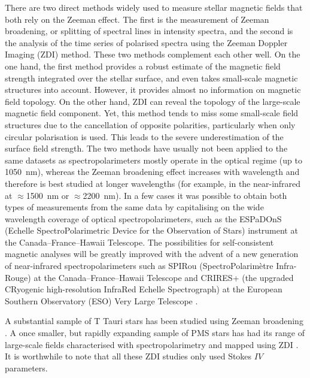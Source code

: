\documentclass{aa}
\begin{document}
There are two direct methods widely used to measure stellar magnetic fields that both rely on the Zeeman effect. The first is the measurement of Zeeman broadening, or splitting of spectral lines in intensity spectra, and the second is the analysis of the time series of polarised spectra using the Zeeman Doppler Imaging (ZDI) method. These two methods complement each other well. On the one hand, the first method provides a robust estimate of the magnetic field strength integrated over the stellar surface, and even takes small-scale magnetic structures into account. However, it provides almost no information on magnetic field topology. On the other hand, ZDI can reveal the topology of the large-scale magnetic field component. Yet, this method tends to miss some small-scale field structures due to the cancellation of opposite polarities, particularly when only circular polarisation is used. This leads to the severe underestimation of the surface field strength. The two methods have usually not been applied to the same datasets as spectropolarimeters mostly operate in the optical regime (up to 1050~nm), whereas the Zeeman broadening effect increases with wavelength and therefore is best studied at longer wavelengths (for example, in the near-infrared at $\approx$1500~nm or $\approx$2200~nm). In a few cases it was possible to obtain both types of measurements from the same data \citep{2017ApJ...835L...4K,2019MNRAS.tmp..410H,2019ApJ...873...69K} by capitalising on the wide wavelength coverage of optical spectropolarimeters, such as the ESPaDOnS (Echelle SpectroPolarimetric Device for the Observation of Stars) instrument \citep{donati2003-espadons} at the Canada--France--Hawaii Telescope. The possibilities for self-consistent magnetic analyses will be greatly improved with the advent of a new generation of near-infrared spectropolarimeters such as SPIRou (SpectroPolarim\`etre Infra-Rouge) at the Canada--France--Hawaii Telescope and CRIRES+ (the upgraded CRyogenic high-resolution InfraRed Echelle Spectrograph) at the European Southern Observatory (ESO) Very Large Telescope \citep{2014SPIE.9147E..15A,2016SPIE.9908E..0ID}.

A substantial sample of T Tauri stars has been studied using Zeeman broadening \citep{1992ApJ...390..622B,1999A&A...341..768G,2005ApJ...635..466Y,2007ApJ...664..975J,2008AJ....136.2286Y,2011ApJ...729...83Y,2017A&A...608A..77L,2018ApJ...853..120S}. A once smaller, but rapidly expanding sample of PMS stars has had its range of large-scale fields characterised with spectropolarimetry and mapped using ZDI \citep[][and references therein]{2019villebrun,2018MNRAS.480.1754N,2019MNRAS.tmp..410H}. It is worthwhile to note that all these ZDI studies only used Stokes $IV$ parameters.
\end{document}
